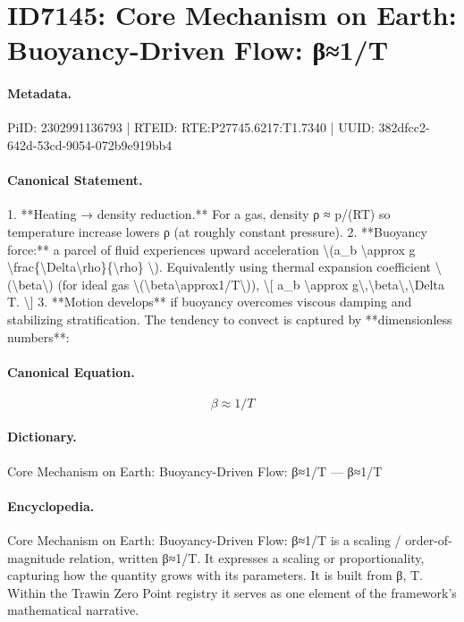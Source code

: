 \section*{ID7145: Core Mechanism on Earth: Buoyancy-Driven Flow: β≈1/T}
\paragraph{Metadata.}
PiID: 2302991136793 | RTEID: RTE:P27745.6217:T1.7340 | UUID: 382dfcc2-642d-53cd-9054-072b9e919bb4

\paragraph{Canonical Statement.}
1. **Heating → density reduction.** For a gas, density ρ ≈ p/(RT) so temperature increase lowers ρ (at roughly constant pressure). 2. **Buoyancy force:** a parcel of fluid experiences upward acceleration \textbackslash{}(a\_b \textbackslash{}approx g \textbackslash{}frac\{\textbackslash{}Delta\textbackslash{}rho\}\{\textbackslash{}rho\} \textbackslash{}). Equivalently using thermal expansion coefficient \textbackslash{}(\textbackslash{}beta\textbackslash{}) (for ideal gas \textbackslash{}(\textbackslash{}beta\textbackslash{}approx1/T\textbackslash{})), \textbackslash{}[ a\_b \textbackslash{}approx g\textbackslash{},\textbackslash{}beta\textbackslash{},\textbackslash{}Delta T. \textbackslash{}] 3. **Motion develops** if buoyancy overcomes viscous damping and stabilizing stratification. The tendency to convect is captured by **dimensionless numbers**:

\paragraph{Canonical Equation.}
\[
\beta\approx1/T
\]

\paragraph{Dictionary.}
Core Mechanism on Earth: Buoyancy-Driven Flow: β≈1/T — β≈1/T

\paragraph{Encyclopedia.}
Core Mechanism on Earth: Buoyancy-Driven Flow: β≈1/T is a scaling / order-of-magnitude relation, written β≈1/T. It expresses a scaling or proportionality, capturing how the quantity grows with its parameters. It is built from β, T. Within the Trawin Zero Point registry it serves as one element of the framework's mathematical narrative.
